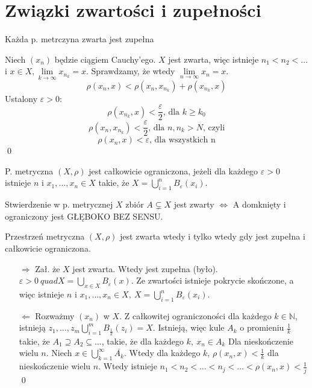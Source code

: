 \section{Związki zwartości i zupełności} 
\begin{tw} Każda p. metrczyna zwarta jest zupełna \end{tw} 
\begin{dd} Niech $(x_n)$ będzie ciągiem Cauchy'ego. $X$ jest zwarta, więc istnieje $n_1 < n_2 < \ldots$ 
    i $x \in X, \lim\limits_{k \to \infty} x_{n_k} = x$. Sprawdzamy, że wtedy $\lim\limits_{n \to \infty} x_n = x$. 
    $$ \rho(x_n,x) < \rho(x_n,x_{n_k}) + \rho(x_{n_k},x) $$
    Ustalony $\varepsilon > 0$: 
    $$ \rho(x_{n_k},x) < \frac{\varepsilon}{2} \text{, dla } k \ge k_0$$
    $$\rho(x_n,x_{n_k}) < \frac{\varepsilon}{2} \text{, dla } n,n_k > N \text{, czyli}$$
    $$\rho(x_n,x) < \varepsilon \text{, dla wszystkich n}$$
    \hfill \qed
\end{dd} 
\begin{df} P. metryczna $(X,\rho)$ jest całkowicie ograniczona, jeżeli dla każdego $\varepsilon > 0$ istnieje 
    $n$ i $x_1,\ldots,x_n \in X$ takie, że $X = \bigcup\limits_{i=1}^n B_\varepsilon(x_i)$.
\end{df}
\begin{uw} Stwierdzenie w p. metrycznej $X$ zbiór $A \subsetneq X$ jest zwarty $\Leftrightarrow$ A domknięty i ograniczony jest GŁĘBOKO BEZ SENSU. \end{uw}
\begin{tw} Przestrzeń metryczna $(X,\rho)$ jest zwarta wtedy i tylko wtedy gdy jest zupełna i całkowicie ograniczona. \end{tw} 
\begin{dd} \hfill 
    \begin{itemize} 
        \item[$\Rightarrow$] Zał. że $X$ jest zwarta. Wtedy jest zupełna (było). \\ 
        $\varepsilon > 0 \ quad X = \bigcup\limits_{x \in X} B_\varepsilon(x)$. Ze zwartości istnieje pokrycie skończone, 
        a więc istnieje $n$ i $x_1,\ldots,x_n \in X, \ X = \bigcup\limits_{i=1}^n B_\varepsilon(x_i)$. 
        \item[$\Leftarrow$] Rozważmy $(x_n)$ w $X$. Z całkowitej ograniczoności dla każdego $k \in \mathbb{N}$,
            istnieją $z_1,\ldots,z_m \bigcup\limits_{i=1}^m B_{\frac{1}{k}}(z_i) = X$. 
            Istnieją, więc kule $A_k$ o promieniu $\frac{1}{k}$ takie, że $A_1 \supseteq A_2 \subseteq \ldots$, 
            takie, że dla każdego $k, \ x_n \in A_k$ Dla nieskończenie wielu $n$.
            Niech $x \in \bigcup\limits_{k=1}^\infty \overline{A_k}$. Wtedy dla każdego 
            $k$, $\rho(x_n,x) < \frac{1}{k}$ dla nieskończenie wielu $n$. Wtedy istnieje $n_1 < n_2 < 
            \ldots < n_j < \ldots < \rho(x_n,x) < \frac{1}{j}$ 
        \hfill \qed
    \end{itemize} 
\end{dd}
